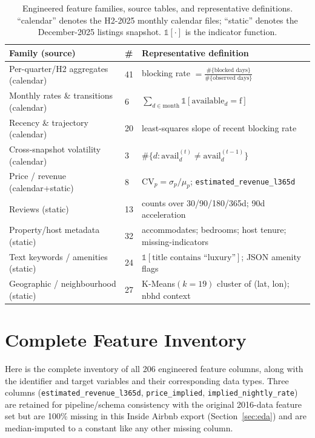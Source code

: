 \documentclass[journal]{IEEEtran}
\begin{document}
\begin{table}[!t]
\caption{Engineered feature families, source tables, and representative
definitions. ``calendar'' denotes the H2-2025 monthly calendar files;
``static'' denotes the December-2025 listings snapshot. $\mathbb{1}[\cdot]$ is
the indicator function.}
\label{tab:featinventory}
\centering
\footnotesize
\begin{tabular}{p{1.05in}p{0.45in}p{1.25in}}
\toprule
Family (source) & \# & Representative definition \\
\midrule
Per-quarter/H2 aggregates (calendar) & 41 & blocking rate $=\frac{\#\{\text{blocked days}\}}{\#\{\text{observed days}\}}$ \\
Monthly rates \& transitions (calendar) & 6 & $\sum_{d\in\text{month}}\mathbb{1}[\text{available}_d{=}\text{f}]$ \\
Recency \& trajectory (calendar) & 20 & least-squares slope of recent blocking rate \\
Cross-snapshot volatility (calendar) & 3 & $\#\{d:\text{avail}_d^{(t)}\ne\text{avail}_d^{(t-1)}\}$ \\
Price / revenue (calendar+static) & 8 & $\mathrm{CV}_p=\sigma_{p}/\mu_{p}$; \texttt{estimated\_revenue\_l365d} \\
Reviews (static) & 13 & counts over 30/90/180/365d; 90d acceleration \\
Property/host metadata (static) & 32 & accommodates; bedrooms; host tenure; missing-indicators \\
Text keywords / amenities (static) & 24 & $\mathbb{1}[\text{title contains ``luxury''}]$; JSON amenity flags \\
Geographic / neighbourhood (static) & 27 & K-Means$(k{=}19)$ cluster of (lat, lon); nbhd context \\
\bottomrule
\end{tabular}
\end{table}


\section{Complete Feature Inventory}
\label{app:allfeatures_table}
Here is the complete inventory of all 206 engineered feature columns, along
with the identifier and target variables and their corresponding data types.
Three columns (\texttt{estimated\_revenue\_l365d}, \texttt{price\_implied},
\texttt{implied\_nightly\_rate}) are retained for pipeline/schema consistency
with the original 2016-data feature set but are 100\% missing in this Inside
Airbnb export (Section~\ref{sec:eda}) and are median-imputed to a constant like
any other missing column.
\end{document}
